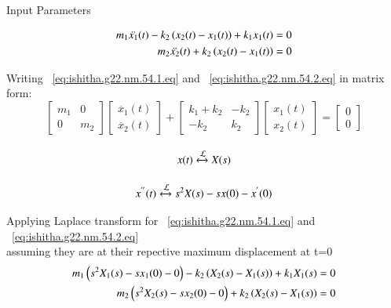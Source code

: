 \documentclass[journal,12pt,twocolumn]{IEEEtran}
\theoremstyle{remark}
\begin{document}
\begin{table}[!ht]    
    \centering
    \resizebox{9cm}{2cm}{
         
    }
    \caption{Input Parameters}
    \label{table:ishitha.g22.nm.54.t1}
\end{table}


\begin{align}
m_1\ddot{x_1}(t) - k_2\left(x_2(t)-x_1(t)\right)+ k_1x_1(t)&=0
\label{eq:ishitha.g22.nm.54.1.eq}\\
m_2\ddot{x_2}(t) + k_2\left(x_2(t)-x_1(t)\right)&=0
\label{eq:ishitha.g22.nm.54.2.eq} 
\end{align}

Writing ~\eqref{eq:ishitha.g22.nm.54.1.eq} and ~\eqref{eq:ishitha.g22.nm.54.2.eq} in matrix form:
\[
\begin{bmatrix}
m_1 & 0  \\
0 & m_2
\end{bmatrix}
\begin{bmatrix}
\ddot{x_1}(t) \\
\ddot{x_2}(t)
\end{bmatrix}
+
\begin{bmatrix}
k_1+k_2 & -k_2  \\
-k_2 & k_2
\end{bmatrix}
\begin{bmatrix}
x_1(t) \\
x_2(t)
\end{bmatrix}
=
\begin{bmatrix}
0 \\
0
\end{bmatrix}
\]

\begin{equation}
x(t)     \stackrel{}{\xleftrightarrow{\mathcal{L}}}   X(s)  
\end{equation}


\begin{equation}
x^{''}(t) \stackrel{}{\xleftrightarrow{\mathcal{L}}} s^{2}X(s)-sx(0)-x^{'}(0)
\end{equation}

Applying Laplace transform for ~\eqref{eq:ishitha.g22.nm.54.1.eq} and ~\eqref{eq:ishitha.g22.nm.54.2.eq} \\ assuming they are at their repective maximum displacement at t=0 
\begin{align}
m_1\left(s^2X_1(s) -sx_1(0)-0\right) - k_2\left(X_2(s)-X_1(s)\right) + k_1X_1(s) &= 0
\label{eq:ishitha.g22.nm.54.3.eq} \\
m_2\left(s^2X_2(s)-sx_2(0)-0\right) + k_2\left(X_2(s)-X_1(s)\right)&=0
\label{eq:ishitha.g22.nm.54.4.eq} 
\end{align}
\end{document}
